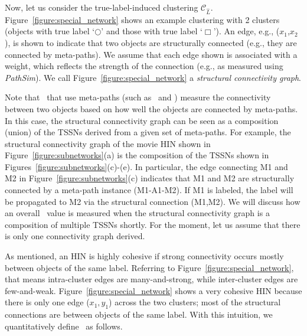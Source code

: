 Now, let us consider the true-label-induced clustering $\mathcal{C}_{\hat{L}}$. 
Figure~\ref{figure:special_network} shows an example clustering with 2 clusters (objects with true label `$\Circle$' and those with
true label `$\Box$').
An edge, e.g., ($x_1$,$x_2$), is shown to indicate that two objects are structurally connected
(e.g., they are connected by meta-paths). 
We assume that each edge shown is associated with a weight, which reflects the strength of the connection
(e.g., as measured using \emph{PathSim}).
We call Figure~\ref{figure:special_network} a {\it structural connectivity graph}.

Note that \tcrs\ that use meta-paths 
(such as \hpm\ and \gm) 
measure the connectivity between two
objects based on how well the objects are connected by meta-paths. In this case, the structural connectivity graph can be
seen as a composition (union) of the TSSNs derived from a given set of meta-paths. 
For example, the structural connectivity graph of the movie HIN shown in Figure~\ref{figure:subnetworks}(a)
is the composition of the TSSNs shown in Figures~\ref{figure:subnetworks}(c)-(e).
In particular, the edge connecting M1 and M2 in Figure~\ref{figure:subnetworks}(c) indicates that
M1 and M2 are structurally connected by a meta-path instance (M1-A1-M2).
If M1 is labeled,
the label will be propagated to M2 via the structural connection (M1,M2).
We will discuss how an overall \chn\ value is measured when the structural connectivity graph is a composition of 
multiple TSSNs shortly. For the moment, let us assume that there is only one connectivity graph derived.

As mentioned, 
an HIN is highly cohesive if strong connectivity occurs mostly between objects of the same label.
Referring to Figure~\ref{figure:special_network}, that means 
intra-cluster edges are many-and-strong, while 
inter-cluster edges are few-and-weak.
Figure~\ref{figure:special_network} shows a very cohesive HIN because
there is only one edge ($x_1,y_1$) across the two clusters; most of the structural connections are between objects of the same label.
With this intuition, we quantitatively define \chn\ as follows.



